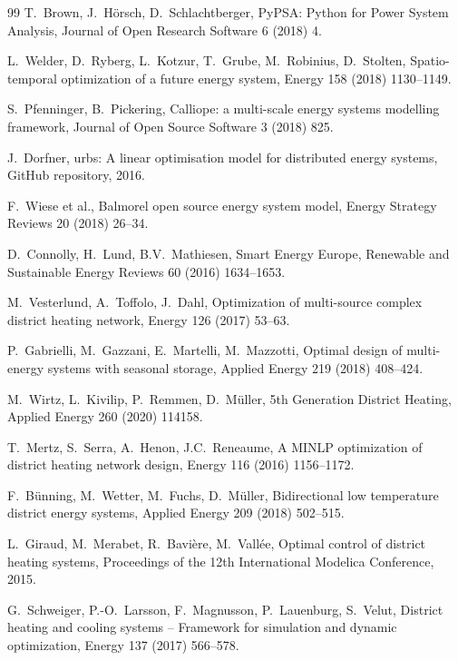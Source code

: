 \documentclass[review,3p]{elsarticle}
\begin{document}
\begin{thebibliography}{99}
T.\ Brown, J.\ Hörsch, D.\ Schlachtberger,
PyPSA: Python for Power System Analysis,
Journal of Open Research Software 6 (2018) 4.

L.\ Welder, D.\ Ryberg, L.\ Kotzur, T.\ Grube, M.\ Robinius,
D.\ Stolten,
Spatio-temporal optimization of a future energy system,
Energy 158 (2018) 1130--1149.

S.\ Pfenninger, B.\ Pickering,
Calliope: a multi-scale energy systems modelling framework,
Journal of Open Source Software 3 (2018) 825.

J.\ Dorfner,
urbs: A linear optimisation model for distributed energy systems,
GitHub repository, 2016.

F.\ Wiese et al.,
Balmorel open source energy system model,
Energy Strategy Reviews 20 (2018) 26--34.

D.\ Connolly, H.\ Lund, B.V.\ Mathiesen,
Smart Energy Europe,
Renewable and Sustainable Energy Reviews 60 (2016) 1634--1653.

M.\ Vesterlund, A.\ Toffolo, J.\ Dahl,
Optimization of multi-source complex district heating network,
Energy 126 (2017) 53--63.

P.\ Gabrielli, M.\ Gazzani, E.\ Martelli, M.\ Mazzotti,
Optimal design of multi-energy systems with seasonal storage,
Applied Energy 219 (2018) 408--424.

M.\ Wirtz, L.\ Kivilip, P.\ Remmen, D.\ Müller,
5th Generation District Heating,
Applied Energy 260 (2020) 114158.

T.\ Mertz, S.\ Serra, A.\ Henon, J.C.\ Reneaume,
A MINLP optimization of district heating network design,
Energy 116 (2016) 1156--1172.

F.\ Bünning, M.\ Wetter, M.\ Fuchs, D.\ Müller,
Bidirectional low temperature district energy systems,
Applied Energy 209 (2018) 502--515.

L.\ Giraud, M.\ Merabet, R.\ Bavière, M.\ Vallée,
Optimal control of district heating systems,
Proceedings of the 12th International Modelica Conference, 2015.

G.\ Schweiger, P.-O.\ Larsson, F.\ Magnusson, P.\ Lauenburg,
S.\ Velut,
District heating and cooling systems -- Framework for simulation
and dynamic optimization,
Energy 137 (2017) 566--578.


\end{thebibliography}
\end{document}
